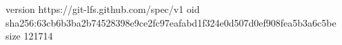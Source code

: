 version https://git-lfs.github.com/spec/v1
oid sha256:63cb6b3ba2b74528398e9ce2fc97eafabd1f324e0d507d0ef908fea5b3a6c5be
size 121714
